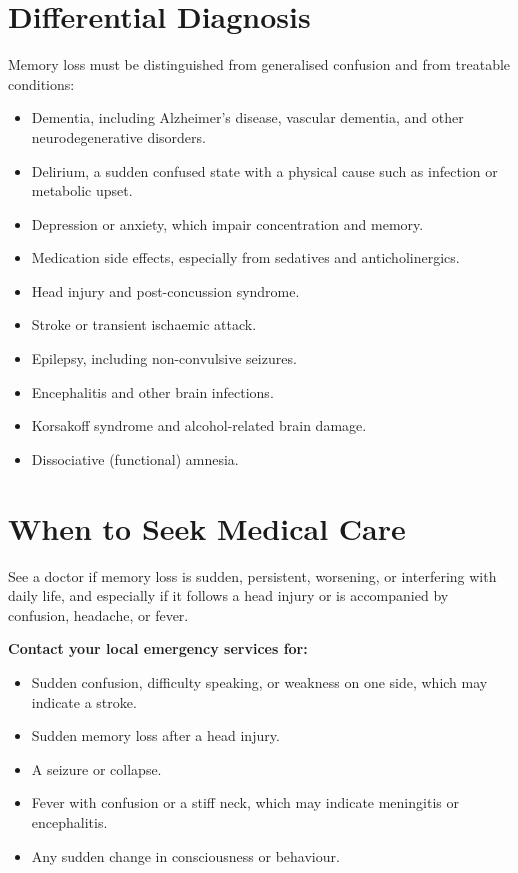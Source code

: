\section*{Differential Diagnosis}
Memory loss must be distinguished from generalised confusion and from treatable conditions:

\begin{itemize}
    \item Dementia, including Alzheimer's disease, vascular dementia, and other neurodegenerative disorders.
    \item Delirium, a sudden confused state with a physical cause such as infection or metabolic upset.
    \item Depression or anxiety, which impair concentration and memory.
    \item Medication side effects, especially from sedatives and anticholinergics.
    \item Head injury and post-concussion syndrome.
    \item Stroke or transient ischaemic attack.
    \item Epilepsy, including non-convulsive seizures.
    \item Encephalitis and other brain infections.
    \item Korsakoff syndrome and alcohol-related brain damage.
    \item Dissociative (functional) amnesia.
\end{itemize}

\section*{When to Seek Medical Care}
See a doctor if memory loss is sudden, persistent, worsening, or interfering with daily life, and especially if it follows a head injury or is accompanied by confusion, headache, or fever.

\textbf{Contact your local emergency services for:}
\begin{itemize}
    \item Sudden confusion, difficulty speaking, or weakness on one side, which may indicate a stroke.
    \item Sudden memory loss after a head injury.
    \item A seizure or collapse.
    \item Fever with confusion or a stiff neck, which may indicate meningitis or encephalitis.
    \item Any sudden change in consciousness or behaviour.
\end{itemize}


